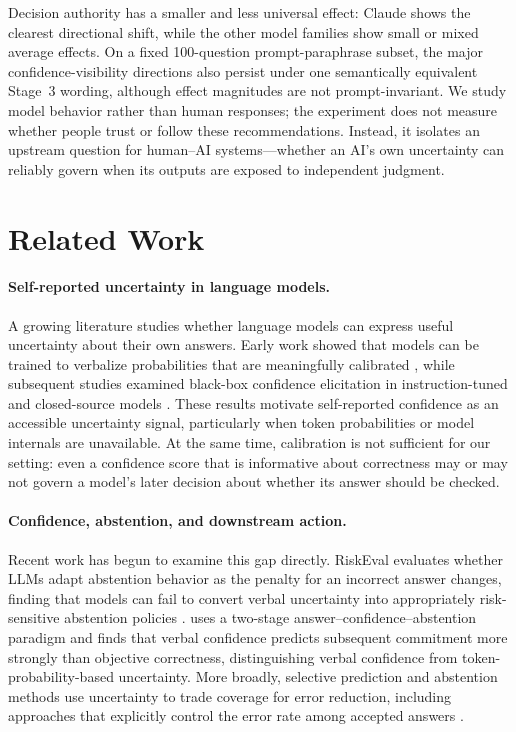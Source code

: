 \documentclass{article}
\begin{document}
Decision authority has a smaller and less universal effect: Claude shows the clearest directional shift, while the other model families show small or mixed average effects. On a fixed 100-question prompt-paraphrase subset, the major confidence-visibility directions also persist under one semantically equivalent Stage~3 wording, although effect magnitudes are not prompt-invariant. We study model behavior rather than human responses; the experiment does not measure whether people trust or follow these recommendations. Instead, it isolates an upstream question for human--AI systems---whether an AI's own uncertainty can reliably govern when its outputs are exposed to independent judgment.

\section{Related Work}

\paragraph{Self-reported uncertainty in language models.}
A growing literature studies whether language models can express useful uncertainty about their own answers. Early work showed that models can be trained to verbalize probabilities that are meaningfully calibrated \citep{lin2022uncertainty}, while subsequent studies examined black-box confidence elicitation in instruction-tuned and closed-source models \citep{tian2023calibration,xiong2024uncertainty}. These results motivate self-reported confidence as an accessible uncertainty signal, particularly when token probabilities or model internals are unavailable. At the same time, calibration is not sufficient for our setting: even a confidence score that is informative about correctness may or may not govern a model's later decision about whether its answer should be checked.

\paragraph{Confidence, abstention, and downstream action.}
Recent work has begun to examine this gap directly. RiskEval evaluates whether LLMs adapt abstention behavior as the penalty for an incorrect answer changes, finding that models can fail to convert verbal uncertainty into appropriately risk-sensitive abstention policies \citep{wang2026faithful}. \citet{kumaran2026commitment} uses a two-stage answer--confidence--abstention paradigm and finds that verbal confidence predicts subsequent commitment more strongly than objective correctness, distinguishing verbal confidence from token-probability-based uncertainty. More broadly, selective prediction and abstention methods use uncertainty to trade coverage for error reduction, including approaches that explicitly control the error rate among accepted answers \citep{dong2026abstention}.
\end{document}
